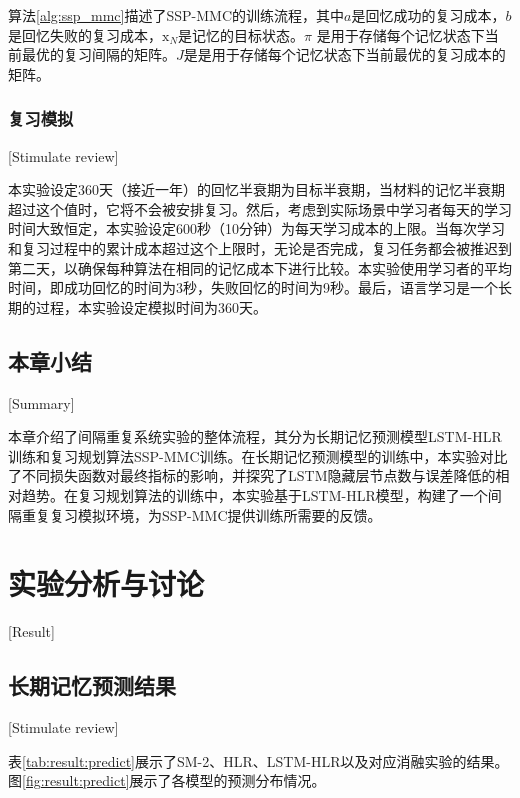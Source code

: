 算法\ref{alg:ssp_mmc}描述了SSP-MMC的训练流程，其中$a$是回忆成功的复习成本，$b$是回忆失败的复习成本，$\bm{\mathrm{x}}_{N}$是记忆的目标状态。$\pi$
是用于存储每个记忆状态下当前最优的复习间隔的矩阵。$J$是是用于存储每个记忆状态下当前最优的复习成本的矩阵。

\subsection{复习模拟}[Stimulate review]

本实验设定360天（接近一年）的回忆半衰期为目标半衰期，当材料的记忆半衰期超过这个值时，它将不会被安排复习。然后，考虑到实际场景中学习者每天的学习时间大致恒定，本实验设定600秒（10分钟）为每天学习成本的上限。当每次学习和复习过程中的累计成本超过这个上限时，无论是否完成，复习任务都会被推迟到第二天，以确保每种算法在相同的记忆成本下进行比较。本实验使用学习者的平均时间，即成功回忆的时间为3秒，失败回忆的时间为9秒。最后，语言学习是一个长期的过程，本实验设定模拟时间为360天。

\section{本章小结}[Summary]

本章介绍了间隔重复系统实验的整体流程，其分为长期记忆预测模型LSTM-HLR训练和复习规划算法SSP-MMC训练。在长期记忆预测模型的训练中，本实验对比了不同损失函数对最终指标的影响，并探究了LSTM隐藏层节点数与误差降低的相对趋势。在复习规划算法的训练中，本实验基于LSTM-HLR模型，构建了一个间隔重复复习模拟环境，为SSP-MMC提供训练所需要的反馈。

\chapter{实验分析与讨论}[Result]

\section{长期记忆预测结果}[Stimulate review]

表\ref{tab:result:predict}展示了SM-2、HLR、LSTM-HLR以及对应消融实验的结果。图\ref{fig:result:predict}展示了各模型的预测分布情况。

